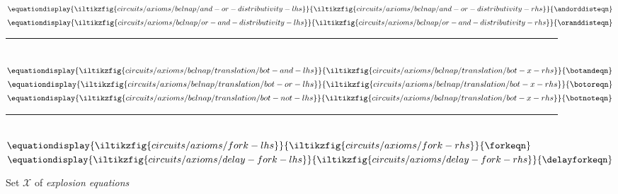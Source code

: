 \begin{figure*}
    \(\equationdisplay{
        \iltikzfig{circuits/axioms/belnap/and-or-distributivity-lhs}
    }{
        \iltikzfig{circuits/axioms/belnap/and-or-distributivity-rhs}
    }{
        \andorddisteqn
    }\)
    \quad
    \(\equationdisplay{
        \iltikzfig{circuits/axioms/belnap/or-and-distributivity-lhs}
    }{
        \iltikzfig{circuits/axioms/belnap/or-and-distributivity-rhs}
    }{
        \oranddisteqn
    }\)
    \\[0.25em]
    \rule{\textwidth}{0.1mm}
    \\[0.5em]
    \(\equationdisplay{
        \iltikzfig{circuits/axioms/belnap/translation/bot-and-lhs}
    }{
        \iltikzfig{circuits/axioms/belnap/translation/bot-x-rhs}
    }{
        \botandeqn
    }\)
    \quad
    \(\equationdisplay{
        \iltikzfig{circuits/axioms/belnap/translation/bot-or-lhs}
    }{
        \iltikzfig{circuits/axioms/belnap/translation/bot-x-rhs}
    }{
        \botoreqn
    }\)
    \quad
    \(\equationdisplay{
        \iltikzfig{circuits/axioms/belnap/translation/bot-not-lhs}
    }{
        \iltikzfig{circuits/axioms/belnap/translation/bot-x-rhs}
    }{
        \botnoteqn
    }\)
    \\[0.25em]
    \rule{\textwidth}{0.1mm}
    \\[0.5em]
    \(\equationdisplay{
        \iltikzfig{circuits/axioms/fork-lhs}
    }{
        \iltikzfig{circuits/axioms/fork-rhs}
    }{
        \forkeqn
    }\)
    \quad
    \(\equationdisplay{
        \iltikzfig{circuits/axioms/delay-fork-lhs}
    }{
        \iltikzfig{circuits/axioms/delay-fork-rhs}
    }{
        \delayforkeqn
    }\)
    \\[0.5em]
    \caption{Set \(\mathcal{X}\) of \emph{explosion equations}}
    \label{fig:explosion-equations}
\end{figure*}